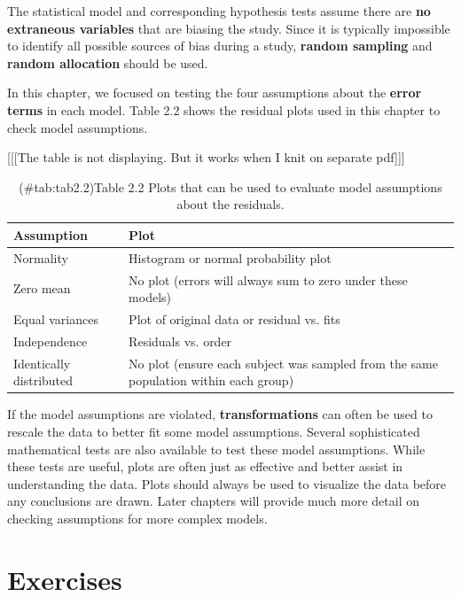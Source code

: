 \documentclass[
]{report}
\begin{document}
The statistical model and corresponding hypothesis tests assume there are \textbf{no extraneous variables} that are biasing the study. Since it is typically impossible to identify all possible sources of bias during a study, \textbf{random sampling} and \textbf{random allocation} should be used.

In this chapter, we focused on testing the four assumptions about the \textbf{error terms} in each model. Table 2.2 shows the residual plots used in this chapter to check model assumptions.

{[}{[}{[}The table is not displaying. But it works when I knit on separate pdf{]}{]}{]}

\begin{table}[!h]
\centering
\caption{(\#tab:tab2.2)Table 2.2 Plots that can be used to evaluate model assumptions about the residuals.}
\centering
\begin{tabular}[t]{ll}
\toprule
Assumption & Plot\\
\midrule
Normality & Histogram or normal probability plot\\
Zero mean & No plot (errors will always sum to zero under these models)\\
Equal variances & Plot of original data or residual vs. fits\\
Independence & Residuals vs. order\\
Identically distributed & No plot (ensure each subject was sampled from the same population within each group)\\
\bottomrule
\end{tabular}
\end{table}

If the model assumptions are violated, \textbf{transformations} can often be used to rescale the data to better fit some model assumptions. Several sophisticated mathematical tests are also available to test these model assumptions. While these tests are useful, plots are often just as effective and better assist in understanding the data. Plots should always be used to visualize the data before any conclusions are drawn. Later chapters will provide much more detail on checking assumptions for more complex models.

\section*{\texorpdfstring{\textbf{Exercises}}{Exercises}}\label{exercises-1}
\end{document}

